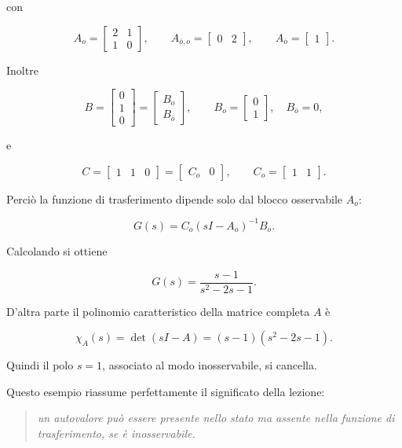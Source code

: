 con

\[
A_o=
\begin{bmatrix}
2 & 1\\
1 & 0
\end{bmatrix},
\qquad
A_{\bar o,o}=
\begin{bmatrix}
0 & 2
\end{bmatrix},
\qquad
A_{\bar o}=
\begin{bmatrix}
1
\end{bmatrix}.
\]

Inoltre

\[
B=
\begin{bmatrix}
0\\1\\0
\end{bmatrix}
=
\begin{bmatrix}
B_o\\
B_{\bar o}
\end{bmatrix},
\qquad
B_o=
\begin{bmatrix}
0\\1
\end{bmatrix},
\quad
B_{\bar o}=0,
\]

e

\[
C=
\begin{bmatrix}
1 & 1 & 0
\end{bmatrix}
=
\begin{bmatrix}
C_o & 0
\end{bmatrix},
\qquad
C_o=
\begin{bmatrix}
1 & 1
\end{bmatrix}.
\]

Perciò la funzione di trasferimento dipende solo dal blocco osservabile \(A_o\):

\[
G(s)=C_o(sI-A_o)^{-1}B_o.
\]

Calcolando si ottiene

\[
G(s)=\frac{s-1}{s^2-2s-1}.
\]

D'altra parte il polinomio caratteristico della matrice completa \(A\) è

\[
\chi_A(s)=\det(sI-A)=(s-1)(s^2-2s-1).
\]

Quindi il polo \(s=1\), associato al modo inosservabile, si cancella.

\medskip

Questo esempio riassume perfettamente il significato della lezione:

\begin{quote}
\emph{un autovalore può essere presente nello stato ma assente nella funzione di trasferimento, se è inosservabile.}
\end{quote}

